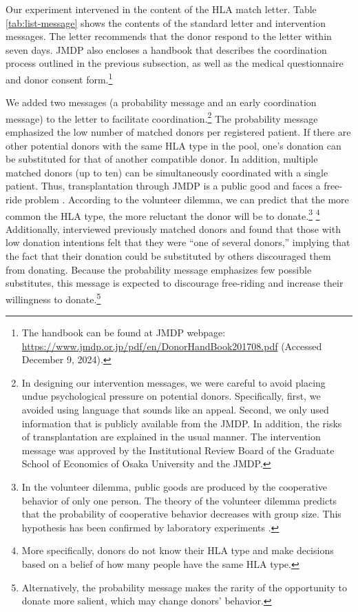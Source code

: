 \documentclass[12pt, a4paper]{article}
\begin{document}
Our experiment intervened in the content of the HLA match letter. Table \ref{tab:list-message} shows the contents of the standard letter and intervention messages. The letter recommends that the donor respond to the letter within seven days. JMDP also encloses a handbook that describes the coordination process outlined in the previous subsection, as well as the medical questionnaire and donor consent form.\footnote{The handbook can be found at JMDP webpage: \url{https://www.jmdp.or.jp/pdf/en/DonorHandBook201708.pdf} (Accessed December 9, 2024).}

We added two messages (a probability message and an early coordination message) to the letter to facilitate coordination.\footnote{In designing our intervention messages, we were careful to avoid placing undue psychological pressure on potential donors. Specifically, first, we avoided using language that sounds like an appeal. Second, we only used information that is publicly available from the JMDP. In addition, the risks of transplantation are explained in the usual manner. The intervention message was approved by the Institutional Review Board of the Graduate School of Economics of Osaka University and the JMDP.} The probability message emphasized the low number of matched donors per registered patient. If there are other potential donors with the same HLA type in the pool, one's donation can be substituted for that of another compatible donor. In addition, multiple matched donors (up to ten) can be simultaneously coordinated with a single patient. Thus, transplantation through JMDP is a public good and faces a free-ride problem \citep{Bergstrom2009}. According to the volunteer dilemma, we can predict that the more common the HLA type, the more reluctant the donor will be to donate.\footnote{In the volunteer dilemma, public goods are produced by the cooperative behavior of only one person. The theory of the volunteer dilemma predicts that the probability of cooperative behavior decreases with group size. This hypothesis has been confirmed by laboratory experiments \citep{Diekmann1985, Diekmann1986, Goeree2017}.} \footnote{More specifically, donors do not know their HLA type and make decisions based on a belief of how many people have the same HLA type.} Additionally, \citet{Kurosawa2022} interviewed previously matched donors and found that those with low donation intentions felt that they were ``one of several donors,'' implying that the fact that their donation could be substituted by others discouraged them from donating. Because the probability message emphasizes few possible substitutes, this message is expected to discourage free-riding and increase their willingness to donate.\footnote{Alternatively, the probability message makes the rarity of the opportunity to donate more salient, which may change donors' behavior.}
\end{document}
